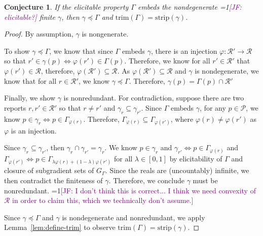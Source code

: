 \documentclass[12pt]{article}
\newcommand{\Comments}{1}
\newcommand{\mynote}[2]{\ifnum\Comments=1\textcolor{#1}{#2}\fi}
\newcommand{\jessie}[1]{\mynote{purple}{[JF: #1]}}
\renewcommand{\P}{\mathcal{P}}
\newcommand{\R}{\mathcal{R}}
\newcommand{\trim}{\mathrm{trim}}
\newcommand{\strip}{\mathrm{strip}}
\newtheorem{conjecture}{Conjecture}
\begin{document}
\begin{conjecture}\label{conj:prec-if-embeds}
	If the elicitable property $\Gamma$ embeds the nondegenerate \jessie{elicitable?} finite $\gamma$, then $\gamma \preceq \Gamma$ and $\trim(\Gamma) = \strip(\gamma)$.
\end{conjecture}
\begin{proof}
	
	By assumption, $\gamma$ is nongenerate.
	
	To show $\gamma \preceq \Gamma$, we know that since $\Gamma$ embeds $\gamma$, there is an injection $\varphi : \R' \to \R$ so that $r' \in \gamma(p) \iff \varphi(r') \in \Gamma(p)$.
	Therefore, we know for all $r' \in \R'$ that $\varphi(r') \in \R$, therefore, $\varphi(\R') \subseteq \R$.
	As $\varphi(\R') \subseteq \R$ and $\gamma$ is nondegenerate, we know that for all $r \in \R'$, we know $\gamma \preceq \Gamma$.
	Therefore, $\gamma(p) = \Gamma(p) \cap \R'$
	
	
	Finally, we show $\gamma$ is nonredundant. 
	For contradiction, suppose there are two reports $r, r' \in \R'$ so that $r \neq r'$ and $\gamma_r \subseteq \gamma_{r'}$.
	Since $\Gamma$ embeds $\gamma$, for any $p \in \P$, we know $p \in \gamma_r \iff p \in \Gamma_{\varphi(r)}$.
	Therefore, $\Gamma_{\varphi(r)} \subseteq \Gamma_{\varphi(r')}$, where $\varphi(r) \neq \varphi(r')$ as $\varphi$ is an injection.
	
	
	Since $\gamma_r \subseteq \gamma_{r'}$, then $\gamma_r \cap \gamma_{r'} = \gamma_r$.
	We know $p \in \gamma_r$ and $\gamma_{r'} \iff p \in \Gamma_{\varphi(r)}$ and $\Gamma_{\varphi(r')} \iff p \in \Gamma_{\lambda \varphi(r) + (1-\lambda) \varphi(r')}$ for all $\lambda \in [0,1]$ by elicitability of $\Gamma$ and closure of subgradient sets of $G_{\Gamma}$.
	Since the reals are (uncountably) infinite, we then contradict the finiteness of $\gamma$.
	Therefore, we conclude $\gamma$ must be nonredundant.
	\jessie{I don't think this is correct... I think we need convexity of $\R$ in order to claim this, which we technically don't assume.}
	
	
	Since $\gamma \preceq \Gamma$ and $\gamma$ is nondegenerate and nonredundant, we apply Lemma~\ref{lem:define-trim} to observe $\trim(\Gamma) = \strip(\gamma)$.
\end{proof}
\end{document}

